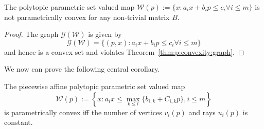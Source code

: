 %
\begin{cor}\label{thm:polytopic:set:not:p:convex}
The polytopic parametric set valued map $\mathcal W(p):=\{x: a_i x + b_i p\leq c_i \forall i\leq m\}$ is not parametrically convex for 
any non-trivial matrix $B$.
\end{cor}
%
\begin{proof}
The graph $\mathscr G(\mathcal W)$ is given by
%
\begin{equation*}
	\mathscr G(\mathcal W) = \{(p,x):a_i x + b_i p\leq c_i \forall i\leq m\}
\end{equation*}
%
and hence is a convex set and violates Theorem~\ref{thm:p:convexity:graph}.
\end{proof}
%
We now can prove the following central corollary.
%
\begin{cor}\label{thm:p:convexity:PWA:set:constant:num:verts}
The piecewise affine polytopic parametric set valued map 
%
\begin{equation}\label{eq:definition:PWA:polytopic:set:general}
	\mathcal W(p) := \left\{x: a_i x \leq \max_{k\leq l}\{b_{i,k} + C_{i,k}p\},i\leq m\right\}
\end{equation}
%
is parametrically convex iff the number of vertices $v_i(p)$ and rays $u_i(p)$ is constant.
\end{cor}
%
